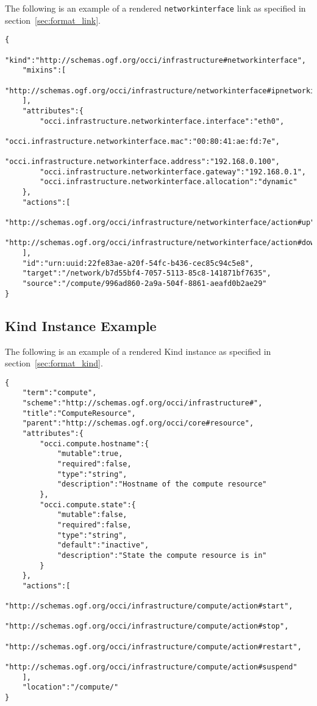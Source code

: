 \documentclass[10pt,a4paper]{article}
\begin{document}
\begin{appendices}
The following is an example of a rendered \texttt{networkinterface} link as specified in section~\ref{sec:format_link}.


\begin{lstlisting}
{
    "kind":"http://schemas.ogf.org/occi/infrastructure#networkinterface",
    "mixins":[
        "http://schemas.ogf.org/occi/infrastructure/networkinterface#ipnetworkinterface"
    ],
    "attributes":{
        "occi.infrastructure.networkinterface.interface":"eth0",
        "occi.infrastructure.networkinterface.mac":"00:80:41:ae:fd:7e",
        "occi.infrastructure.networkinterface.address":"192.168.0.100",
        "occi.infrastructure.networkinterface.gateway":"192.168.0.1",
        "occi.infrastructure.networkinterface.allocation":"dynamic"
    },
    "actions":[
        "http://schemas.ogf.org/occi/infrastructure/networkinterface/action#up",
        "http://schemas.ogf.org/occi/infrastructure/networkinterface/action#down"
    ],
    "id":"urn:uuid:22fe83ae-a20f-54fc-b436-cec85c94c5e8",
    "target":"/network/b7d55bf4-7057-5113-85c8-141871bf7635",
    "source":"/compute/996ad860-2a9a-504f-8861-aeafd0b2ae29"
}
\end{lstlisting}

\subsection{Kind Instance Example}
\label{kind_instance_rendering_example}

The following is an example of a rendered Kind instance as specified in section~\ref{sec:format_kind}.

\begin{lstlisting}
{
    "term":"compute",
    "scheme":"http://schemas.ogf.org/occi/infrastructure#",
    "title":"ComputeResource",
    "parent":"http://schemas.ogf.org/occi/core#resource",
    "attributes":{
        "occi.compute.hostname":{
            "mutable":true,
            "required":false,
            "type":"string",
            "description":"Hostname of the compute resource"
        },
        "occi.compute.state":{
            "mutable":false,
            "required":false,
            "type":"string",
            "default":"inactive",
            "description":"State the compute resource is in"
        }
    },
    "actions":[
        "http://schemas.ogf.org/occi/infrastructure/compute/action#start",
        "http://schemas.ogf.org/occi/infrastructure/compute/action#stop",
        "http://schemas.ogf.org/occi/infrastructure/compute/action#restart",
        "http://schemas.ogf.org/occi/infrastructure/compute/action#suspend"
    ],
    "location":"/compute/"
}
\end{lstlisting}


\end{appendices}
\end{document}
